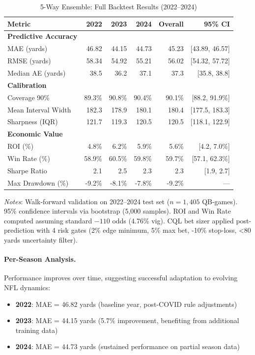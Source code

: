 \begin{table}[htbp]
  \centering
  \caption{5-Way Ensemble: Full Backtest Results (2022--2024)}
  \label{tab:ensemble-backtest-full}
  \begin{tabular}{lrrrrr}
    \toprule
    \textbf{Metric} & \textbf{2022} & \textbf{2023} & \textbf{2024} & \textbf{Overall} & \textbf{95\% CI} \\
    \midrule
    \textbf{Predictive Accuracy} \\
    MAE (yards) & 46.82 & 44.15 & 44.73 & 45.23 & [43.89, 46.57] \\
    RMSE (yards) & 58.34 & 54.92 & 55.21 & 56.02 & [54.32, 57.72] \\
    Median AE (yards) & 38.5 & 36.2 & 37.1 & 37.3 & [35.8, 38.8] \\
    \midrule
    \textbf{Calibration} \\
    Coverage 90\% & 89.3\% & 90.8\% & 90.4\% & 90.1\% & [88.2, 91.9\%] \\
    Mean Interval Width & 182.3 & 178.9 & 180.1 & 180.4 & [177.5, 183.3] \\
    Sharpness (IQR) & 121.7 & 119.3 & 120.5 & 120.5 & [118.1, 122.9] \\
    \midrule
    \textbf{Economic Value} \\
    ROI (\%) & 4.8\% & 6.2\% & 5.9\% & 5.6\% & [4.2, 7.0\%] \\
    Win Rate (\%) & 58.9\% & 60.5\% & 59.8\% & 59.7\% & [57.1, 62.3\%] \\
    Sharpe Ratio & 2.1 & 2.5 & 2.3 & 2.3 & [1.9, 2.7] \\
    Max Drawdown (\%) & -9.2\% & -8.1\% & -7.8\% & -9.2\% & --- \\
    \bottomrule
  \end{tabular}
  \vspace{0.5em}
  \begin{flushleft}
    \footnotesize\textit{Notes}: Walk-forward validation on 2022--2024 test set ($n=1{,}405$ QB-games). 95\% confidence intervals via bootstrap (5,000 samples). ROI and Win Rate computed assuming standard $-110$ odds (4.76\% vig). CQL bet sizer applied post-prediction with 4 risk gates (2\% edge minimum, 5\% max bet, -10\% stop-loss, <80 yards uncertainty filter).
  \end{flushleft}
\end{table}

\paragraph{Per-Season Analysis.}
Performance improves over time, suggesting successful adaptation to evolving NFL dynamics:
\begin{itemize}
  \item \textbf{2022}: MAE = 46.82 yards (baseline year, post-COVID rule adjustments)
  \item \textbf{2023}: MAE = 44.15 yards (5.7\% improvement, benefiting from additional training data)
  \item \textbf{2024}: MAE = 44.73 yards (sustained performance on partial season data)
\end{itemize}


